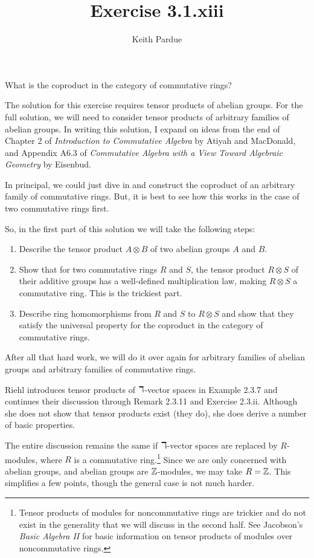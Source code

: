 \documentclass{article}
\title{Exercise 3.1.xiii}
\author{Keith Pardue}
\begin{document}
\maketitle

\begin{exercise}
What is the coproduct in the category of commutative rings?
\end{exercise}

The solution for this exercise requires tensor products of abelian groups. For the full solution, we will need to consider tensor products of arbitrary families of abelian groups. In writing this solution, I expand on ideas from the end of Chapter 2 of {\it Introduction to Commutative Algebra} by Atiyah and MacDonald, and Appendix A6.3 of {\it Commutative Algebra with a View Toward Algebraic Geometry} by Eisenbud.

In principal, we could just dive in and construct the coproduct of an arbitrary family of commutative rings. But, it is best to see how this works in the case of two commutative rings first.

So, in the first part of this solution we will  take the following steps:
\begin{enumerate}
\item Describe the tensor product $A\otimes B$ of two abelian  groups $A$  and $B$.
\item Show that for two commutative rings $R$ and $S$, the tensor product $R\otimes S$ of their additive groups has a well-defined multiplication law, making $R\otimes S$ a commutative ring. This is the  trickiest part.
\item Describe ring homomorphisms from $R$ and  $S$ to $R\otimes S$ and show that they satisfy the universal property  for the coproduct in the category of commutative rings.
\end{enumerate}

After all that hard work, we will do it over again for arbitrary families of abelian groups and arbitrary families of commutative rings.

Riehl introduces tensor products of $\mathbb{k}$-vector spaces in Example 2.3.7 and continues their discussion through Remark 2.3.11 and Exercise 2.3.ii. Although she does not show that tensor products exist (they do), she does derive a number of basic properties.

The entire discussion remains the same if $\mathbb{k}$-vector spaces are replaced by $R$-modules, where $R$ is a commutative ring.\footnote{Tensor products of modules for noncommutative rings are trickier and do not  exist in the generality that we will discuss  in the second half. See Jacobson's {\it Basic Algebra II} for basic information on tensor products of modules over noncommutative rings.} Since we are only concerned with abelian groups, and abelian groups are $\mathbb{Z}$-modules, we may take $R=\mathbb{Z}$. This simplifies a few points, though the general case is not much harder. 
\end{document}
